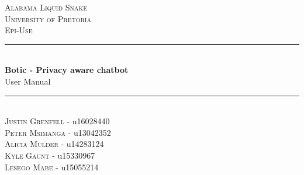 \documentclass[11pt]{article}
\begin{document}
\begin{titlepage}
	\newcommand{\HRule}{\rule{\linewidth}{0.5mm}}
    \begin{center}

    	\textsc{\LARGE Alabama Liquid Snake}\\[0.8cm]
    	\textsc{\Large University of Pretoria}\\[0.5cm]
    	\textsc{\large Epi-Use}\\[0.5cm]

    	\HRule\\[0.4cm]

    	{\huge\bfseries Botic - Privacy aware chatbot}\\[0.2cm]

    	{\huge User Manual}\\[0.2cm]

    	\HRule\\[0.5cm]

	    \textsc{Justin Grenfell} - u16028440 \\[0cm]
	    \textsc{Peter Msimanga} - u13042352 \\[0cm]
	    \textsc{Alicia Mulder} - u14283124 \\[0cm]
	    \textsc{Kyle Gaunt} - u15330967 \\[0cm]
	    \textsc{Lesego Mabe} - u15055214 \\[0cm]

    \end{center}
\end{titlepage}
\tableofcontents
\newpage
\end{document}
